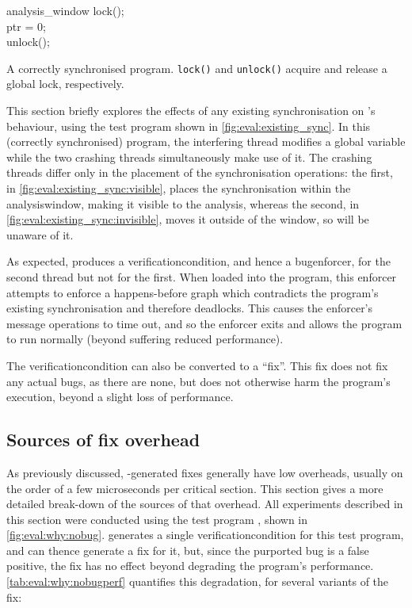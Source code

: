 \begin{sanefig}
{\begin{minipage}{3cm}
\begin{literalC}
          analysis\_window \clbrace
            lock();\\
            ptr = 0;\\
            unlock();
          \crbrace
        \crbrace
        \\
      \end{literalC}
    \end{minipage}
    \label{fig:eval:existing_sync:interfering}
  }
  \vspace{-12pt}
  \caption{A correctly synchronised program.  \texttt{lock()} and
    \texttt{unlock()} acquire and release a global lock,
    respectively.}
  \label{fig:eval:existing_sync}
\end{sanefig}

\noindent
This section briefly explores the effects of any existing
synchronisation on {\technique}'s behaviour, using the test program
shown in \autoref{fig:eval:existing_sync}.  In this (correctly
synchronised) program, the interfering thread modifies a global
variable while the two crashing threads simultaneously make use of it.
The crashing threads differ only in the placement of the
synchronisation operations: the first, in
\autoref{fig:eval:existing_sync:visible}, places the synchronisation
within the \gls{analysiswindow}, making it visible to the {\technique}
analysis, whereas the second, in
\autoref{fig:eval:existing_sync:invisible}, moves it outside of the
window, so {\technique} will be unaware of it.

As expected, {\technique} produces a \gls{verificationcondition}, and
hence a \gls{bugenforcer}, for the second thread but not for the
first.  When loaded into the program, this enforcer attempts to
enforce a happens-before graph which contradicts the program's
existing synchronisation and therefore deadlocks.  This causes the
enforcer's message operations to time out, and so the enforcer exits
and allows the program to run normally (beyond suffering reduced
performance).

The \gls{verificationcondition} can also be converted to a ``fix''.
This fix does not fix any actual bugs, as there are none, but does not
otherwise harm the program's execution, beyond a slight loss of
performance.

\subsection{Sources of fix overhead}
\label{sect:eval:why:fix_overhead}

As previously discussed, {\technique}-generated fixes generally have
low overheads, usually on the order of a few microseconds per critical
section.  This section gives a more detailed break-down of the sources
of that overhead.  All experiments described in this section were
conducted using the test program , shown in
\autoref{fig:eval:why:nobug}.  {\Technique} generates a single
\gls{verificationcondition} for this test program, and can thence
generate a fix for it, but, since the purported bug is a false
positive, the fix has no effect beyond degrading the program's
performance.  \autoref{tab:eval:why:nobugperf} quantifies this
degradation, for several variants of the fix:


